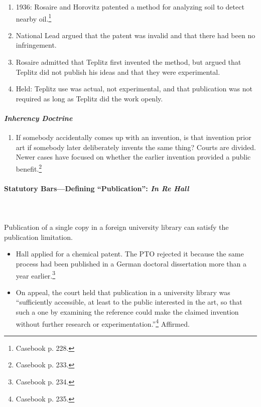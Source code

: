 \begin{enumerate}
    \item 1936: Rosaire and Horovitz patented a method for analyzing soil to 
    detect nearby oil.\footnote{Casebook p. 228.}
    \item National Lead argued that the patent was invalid and that there had 
    been no infringement.
    \item Rosaire admitted that Teplitz first invented the method, but argued 
    that Teplitz did not publish his ideas and that they were experimental.
    \item Held: Teplitz use was actual, not experimental, and that publication 
    was not required as long as Teplitz did the work openly.
\end{enumerate}

\paragraph{\emph{Inherency Doctrine}} 

\begin{enumerate}
    \item If somebody accidentally comes up with an invention, is that 
    invention prior art if somebody later deliberately invents the same thing? 
    Courts are divided. Newer cases have focused on whether the earlier 
    invention provided a public benefit.\footnote{Casebook p. 233.}
\end{enumerate}

\paragraph{Statutory Bars---Defining ``Publication'': \emph{In Re Hall}}
~\\\\
Publication of a single copy in a foreign university library can satisfy 
the publication limitation.

\begin{itemize}
    \item Hall applied for a chemical patent. The PTO rejected it because the 
    same process had been published in a German doctoral dissertation more than 
    a year earlier.\footnote{Casebook p. 234.}
    \item On appeal, the court held that publication in a university library was 
    ``sufficiently accessible, at least to the public interested in the art, so 
    that such a one by examining the reference could make the claimed invention 
    without further research or experimentation.''\footnote{Casebook p. 235.} 
    Affirmed.
\end{itemize}

